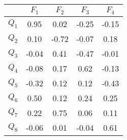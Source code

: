 \begin{tabular}{|l|c|c|c|c|}
\hline
&\textbf{$F_{1}$}&\textbf{$F_{2}$}&\textbf{$F_{3}$}&\textbf{$F_{4}$}\\\hline
\textbf{$Q_{1}$}&0.95&0.02&-0.25&-0.15\\\hline
\textbf{$Q_{2}$}&0.10&-0.72&-0.07&0.18\\\hline
\textbf{$Q_{3}$}&-0.04&0.41&-0.47&-0.01\\\hline
\textbf{$Q_{4}$}&-0.08&0.17&0.62&-0.13\\\hline
\textbf{$Q_{5}$}&-0.32&0.12&0.12&-0.43\\\hline
\textbf{$Q_{6}$}&0.50&0.12&0.24&0.25\\\hline
\textbf{$Q_{7}$}&0.22&0.75&0.06&0.11\\\hline
\textbf{$Q_{8}$}&-0.06&0.01&-0.04&0.61\\\hline
\end{tabular}
